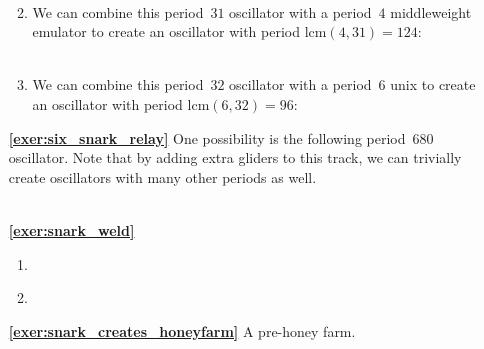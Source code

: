 \begin{multicols}{2}
\begin{itemize}[leftmargin=0em]
\begin{enumerate}[leftmargin=1.5em,label=\bf\color{ocre}(\alph*)]
		 \\

		\item We can combine this period~$31$ oscillator with a period~$4$ middleweight emulator to create an oscillator with period $\mathrm{lcm}(4,31) = 124$:  \\[-0.6em]
		
		 \\

		\item We can combine this period~$32$ oscillator with a period~$6$ unix to create an oscillator with period $\mathrm{lcm}(6,32) = 96$: \\[-0.6em]
		
	\end{enumerate}
	
	
	\item[\bf\color{ocre}\sffamily\ref{exer:six_snark_relay}] One possibility is the following period~$680$ oscillator. Note that by adding extra gliders to this track, we can trivially create oscillators with many other periods as well. \\[-0.6em]
	
	 \\
	

	\item[\bf\color{ocre}\sffamily\ref{exer:snark_weld}]
	\begin{enumerate}[leftmargin=1.5em,label=\bf\color{ocre}(\alph*)]
		\item {}
		
		\item {} \\
	\end{enumerate}
	
	
	\item[\bf\color{ocre}\sffamily\ref{exer:snark_creates_honeyfarm}] A pre-honey farm. \\
	

\end{itemize}
\end{multicols}
